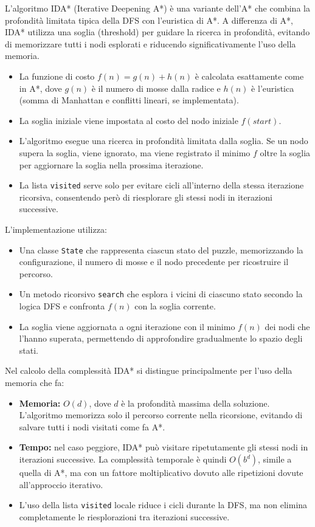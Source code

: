 L'algoritmo IDA* (Iterative Deepening A*) è una variante dell'A* che combina la profondità limitata tipica della DFS con l'euristica di A*. A differenza di A*, IDA* utilizza una soglia (threshold) per guidare la ricerca in profondità, evitando di memorizzare tutti i nodi esplorati e riducendo significativamente l'uso della memoria.
\begin{itemize}
    \item La funzione di costo $f(n) = g(n) + h(n)$ è calcolata esattamente come in A*, dove $g(n)$ è il numero di mosse dalla radice e $h(n)$ è l'euristica (somma di Manhattan e conflitti lineari, se implementata).
    \item La soglia iniziale viene impostata al costo del nodo iniziale $f(start)$.
    \item L'algoritmo esegue una ricerca in profondità limitata dalla soglia. Se un nodo supera la soglia, viene ignorato, ma viene registrato il minimo $f$ oltre la soglia per aggiornare la soglia nella prossima iterazione.
    \item La lista \texttt{visited} serve solo per evitare cicli all'interno della stessa iterazione ricorsiva, consentendo però di riesplorare gli stessi nodi in iterazioni successive.
\end{itemize}
L'implementazione utilizza:
\begin{itemize}
    \item Una classe \texttt{State} che rappresenta ciascun stato del puzzle, memorizzando la configurazione, il numero di mosse e il nodo precedente per ricostruire il percorso.
    \item Un metodo ricorsivo \texttt{search} che esplora i vicini di ciascuno stato secondo la logica DFS e confronta $f(n)$ con la soglia corrente.
    \item La soglia viene aggiornata a ogni iterazione con il minimo $f(n)$ dei nodi che l'hanno superata, permettendo di approfondire gradualmente lo spazio degli stati.
\end{itemize}

Nel calcolo della complessità IDA* si distingue principalmente per l'uso della memoria che fa: 

\begin{itemize}
    \item \textbf{Memoria:} $O(d)$, dove $d$ è la profondità massima della soluzione. L'algoritmo memorizza solo il percorso corrente nella ricorsione, evitando di salvare tutti i nodi visitati come fa A*.
    \item \textbf{Tempo:} nel caso peggiore, IDA* può visitare ripetutamente gli stessi nodi in iterazioni successive. La complessità temporale è quindi $O(b^d)$, simile a quella di A*, ma con un fattore moltiplicativo dovuto alle ripetizioni dovute all’approccio iterativo.
    \item L'uso della lista \texttt{visited} locale riduce i cicli durante la DFS, ma non elimina completamente le riesplorazioni tra iterazioni successive.
\end{itemize}

